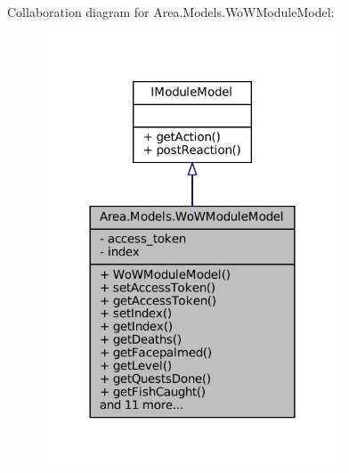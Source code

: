 Collaboration diagram for Area.\+Models.\+Wo\+W\+Module\+Model\+:
\nopagebreak
\begin{figure}[H]
\begin{center}
\leavevmode
\includegraphics[width=252pt]{classArea_1_1Models_1_1WoWModuleModel__coll__graph}
\end{center}
\end{figure}
